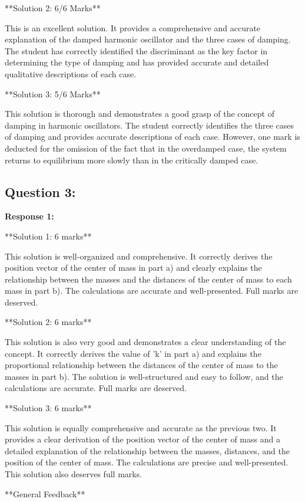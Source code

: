 \documentclass[a4paper,11pt]{article}
\begin{document}
**Solution 2: 6/6 Marks**

This is an excellent solution. It provides a comprehensive and accurate explanation of the damped harmonic oscillator and the three cases of damping. The student has correctly identified the discriminant as the key factor in determining the type of damping and has provided accurate and detailed qualitative descriptions of each case.

**Solution 3: 5/6 Marks**

This solution is thorough and demonstrates a good grasp of the concept of damping in harmonic oscillators. The student correctly identifies the three cases of damping and provides accurate descriptions of each case. However, one mark is deducted for the omission of the fact that in the overdamped case, the system returns to equilibrium more slowly than in the critically damped case.

\subsection*{Question 3:}

\textbf{Response 1:}

**Solution 1: 6 marks**

This solution is well-organized and comprehensive. It correctly derives the position vector of the center of mass in part a) and clearly explains the relationship between the masses and the distances of the center of mass to each mass in part b). The calculations are accurate and well-presented. Full marks are deserved.

**Solution 2: 6 marks**

This solution is also very good and demonstrates a clear understanding of the concept. It correctly derives the value of  'k' in part a) and explains the proportional relationship between the distances of the center of mass to the masses in part b). The solution is well-structured and easy to follow, and the calculations are accurate. Full marks are deserved.

**Solution 3: 6 marks**

This solution is equally comprehensive and accurate as the previous two. It provides a clear derivation of the position vector of the center of mass and a detailed explanation of the relationship between the masses, distances, and the position of the center of mass. The calculations are precise and well-presented. This solution also deserves full marks.

**General Feedback**
\end{document}
